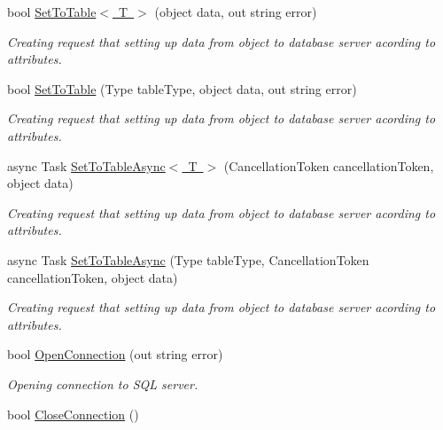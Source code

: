 \begin{DoxyCompactItemize}
bool \mbox{\hyperlink{class_uniform_data_operator_1_1_sql_1_1_my_sql_1_1_my_sql_data_operator_ac1bee965fd57e9b2949c09a6b72a9e3e}{Set\+To\+Table$<$ T $>$}} (object data, out string error)
\begin{DoxyCompactList}\small\item\em Creating request that setting up data from object to database server acording to attributes. \end{DoxyCompactList}\item 
bool \mbox{\hyperlink{class_uniform_data_operator_1_1_sql_1_1_my_sql_1_1_my_sql_data_operator_a5a12c84883a7e4945b4fb3787a39b302}{Set\+To\+Table}} (Type table\+Type, object data, out string error)
\begin{DoxyCompactList}\small\item\em Creating request that setting up data from object to database server acording to attributes. \end{DoxyCompactList}\item 
async Task \mbox{\hyperlink{class_uniform_data_operator_1_1_sql_1_1_my_sql_1_1_my_sql_data_operator_ac615a17b6330b292dcf3fd912e1f4fe2}{Set\+To\+Table\+Async$<$ T $>$}} (Cancellation\+Token cancellation\+Token, object data)
\begin{DoxyCompactList}\small\item\em Creating request that setting up data from object to database server acording to attributes. \end{DoxyCompactList}\item 
async Task \mbox{\hyperlink{class_uniform_data_operator_1_1_sql_1_1_my_sql_1_1_my_sql_data_operator_a036b234868363f2f680e5157ee459439}{Set\+To\+Table\+Async}} (Type table\+Type, Cancellation\+Token cancellation\+Token, object data)
\begin{DoxyCompactList}\small\item\em Creating request that setting up data from object to database server acording to attributes. \end{DoxyCompactList}\item 
bool \mbox{\hyperlink{class_uniform_data_operator_1_1_sql_1_1_my_sql_1_1_my_sql_data_operator_ae7ad4f4d29d927fa8551b087a6e596b5}{Open\+Connection}} (out string error)
\begin{DoxyCompactList}\small\item\em Opening connection to S\+QL server. \end{DoxyCompactList}\item 
bool \mbox{\hyperlink{class_uniform_data_operator_1_1_sql_1_1_my_sql_1_1_my_sql_data_operator_ae096306ef55611afbe96b0017f2032f6}{Close\+Connection}} ()

\end{DoxyCompactItemize}
